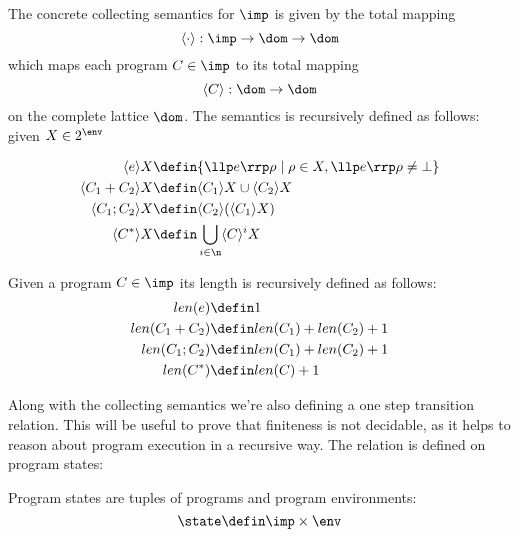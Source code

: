 \begin{definition}
  The concrete collecting semantics for \(\imp\) is given by the total
  mapping \[\langle \cdot \rangle : \imp \to \dom \to \dom\] which
  maps each program \(C \in \imp\) to its total mapping \[\langle C
  \rangle : \dom \to \dom\] on the complete lattice \(\dom\). The
  semantics is recursively defined as follows: given \(X \in 2^\env\)

  \begin{align*}
    \langle e \rangle X & \defin \{\llp e \rrp \rho \mid \rho \in X,
    \llp e \rrp \rho \neq \bot\} \\
    \langle C_1 + C_2 \rangle X & \defin \langle C_1 \rangle X \cup
    \langle C_2 \rangle X \\
    \langle C_1 ; C_2 \rangle X & \defin \langle C_2 \rangle (\langle
    C_1 \rangle X) \\
    \langle C^* \rangle X & \defin \bigcup_{i \in \n} \langle C \rangle^i X
  \end{align*}
\end{definition}

\begin{definition}
  Given a program \(C\in\imp\) its length is recursively defined as
  follows:
  \begin{align*}
    len(e)         & \defin 1 \\
    len(C_1 + C_2) & \defin len(C_1) + len(C_2) + 1 \\
    len(C_1;C_2)   & \defin len(C_1) + len(C_2) + 1 \\
    len(C^*)       & \defin len(C) + 1
  \end{align*}
\end{definition}

Along with the collecting semantics we're also defining a one step
transition relation. This will be useful to prove that finiteness is
not decidable, as it helps to reason about program execution in a
recursive way. The relation is defined on program states:

\begin{definition}
  Program states are tuples of programs and program
  environments: \[\state \defin \imp \times \env\]
\end{definition}

